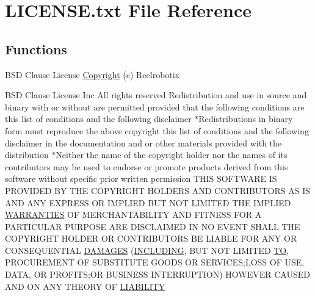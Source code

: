 \hypertarget{LICENSE_8txt}{}\section{L\+I\+C\+E\+N\+S\+E.\+txt File Reference}
\label{LICENSE_8txt}
\subsection*{Functions}
\begin{DoxyCompactItemize}
\item 
B\+SD Clause License \hyperlink{LICENSE_8txt_a19b68447d148b488af6def87a9cb71ba}{Copyright} (c) Reelrobotix
\item 
B\+SD Clause License Inc All rights reserved Redistribution and use in source and binary with or without are permitted provided that the following conditions are this list of conditions and the following disclaimer $\ast$Redistributions in binary form must reproduce the above copyright this list of conditions and the following disclaimer in the documentation and or other materials provided with the distribution $\ast$Neither the name of the copyright holder nor the names of its contributors may be used to endorse or promote products derived from this software without specific prior written permission T\+H\+IS S\+O\+F\+T\+W\+A\+RE IS P\+R\+O\+V\+I\+D\+ED BY T\+HE C\+O\+P\+Y\+R\+I\+G\+HT H\+O\+L\+D\+E\+RS A\+ND C\+O\+N\+T\+R\+I\+B\+U\+T\+O\+RS AS IS A\+ND A\+NY E\+X\+P\+R\+E\+SS OR I\+M\+P\+L\+I\+ED B\+UT N\+OT L\+I\+M\+I\+T\+ED T\+HE I\+M\+P\+L\+I\+ED \hyperlink{LICENSE_8txt_a8472295fc7dc3e152751655a351cab17}{W\+A\+R\+R\+A\+N\+T\+I\+ES} OF M\+E\+R\+C\+H\+A\+N\+T\+A\+B\+I\+L\+I\+TY A\+ND F\+I\+T\+N\+E\+SS F\+OR A P\+A\+R\+T\+I\+C\+U\+L\+AR P\+U\+R\+P\+O\+SE A\+RE D\+I\+S\+C\+L\+A\+I\+M\+ED IN NO E\+V\+E\+NT S\+H\+A\+LL T\+HE C\+O\+P\+Y\+R\+I\+G\+HT H\+O\+L\+D\+ER OR C\+O\+N\+T\+R\+I\+B\+U\+T\+O\+RS BE L\+I\+A\+B\+LE F\+OR A\+NY OR C\+O\+N\+S\+E\+Q\+U\+E\+N\+T\+I\+AL \hyperlink{LICENSE_8txt_ae4e5ba7d6e99370d4c12feff5651d808}{D\+A\+M\+A\+G\+ES} (\hyperlink{LICENSE_8txt_aa4b11f541e6ee38e9eb74721057af7f2}{I\+N\+C\+L\+U\+D\+I\+NG}, B\+UT N\+OT L\+I\+M\+I\+T\+ED \hyperlink{LICENSE_8txt_a2c6391e9fede2624d7b114e2961298af}{TO}, P\+R\+O\+C\+U\+R\+E\+M\+E\+NT OF S\+U\+B\+S\+T\+I\+T\+U\+TE G\+O\+O\+DS OR S\+E\+R\+V\+I\+C\+ES;L\+O\+SS OF U\+SE, D\+A\+TA, OR P\+R\+O\+F\+I\+TS;OR B\+U\+S\+I\+N\+E\+SS I\+N\+T\+E\+R\+R\+U\+P\+T\+I\+ON) H\+O\+W\+E\+V\+ER C\+A\+U\+S\+ED A\+ND ON A\+NY T\+H\+E\+O\+RY OF \hyperlink{LICENSE_8txt_a416744a998d192df4986ba8975d9bb08}{L\+I\+A\+B\+I\+L\+I\+TY}

\end{DoxyCompactItemize}
